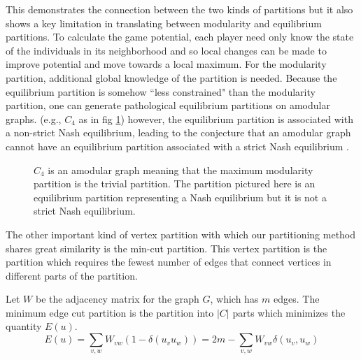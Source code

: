 \documentclass{article}
\begin{document}
This demonstrates the connection between the two kinds of partitions but it also shows a key limitation in translating between modularity and equilibrium partitions. To calculate the game potential, each player need only know the state of the individuals in its neighborhood and so local changes can be made to improve potential and move towards a local maximum. For the modularity partition, additional global knowledge of the partition is needed.  Because the equilibrium partition is somehow ``less constrained" than the modularity partition,  one can generate pathological equilibrium partitions on amodular graphs. (e.g., $C_4$ as in fig \ref{fig:amodular}) however, the equilibrium partition is associated with a non-strict Nash equilibrium, leading to the conjecture that an amodular graph cannot have an equilibrium partition associated with a strict Nash equilibrium \citep{McAlister2026}.
\begin{figure}
    \centering
    \caption{$C_4$ is an amodular graph meaning that the maximum modularity partition is the trivial partition. The partition pictured here is an equilibrium partition representing a Nash equilibrium but it is not a strict Nash equilibrium. }
    \label{fig:amodular}
\end{figure}

The other important kind of vertex partition with which our partitioning method shares great similarity is the min-cut partition. This vertex partition is the partition which requires the fewest number of edges that connect vertices in different parts of the partition. 

Let $W$ be the adjacency matrix for the graph $G$, which has $m$ edges. The minimum edge cut partition is the partition into $|C|$ parts which minimizes the quantity $E(u)$. 
		\begin{equation}\label{eq:mincut}
			E(u) = \sum_{v,w}W_{vw}(1-\delta(u_vu_w))= 2m-\sum_{v,w}W_{vw}\delta(u_v,u_w)	\end{equation}
\end{document}
